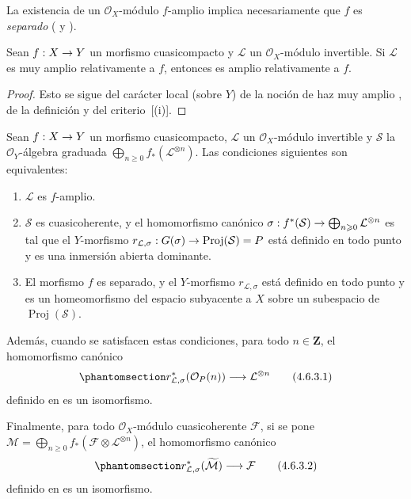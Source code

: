 \documentclass[oneside,10pt]{amsart}
\makeatletter
\renewcommand{\geq}{\geqslant}
\newcommand{\ega@arrow}[2]{\mathchoice{#1}{#2}{#2}{#2}}
\renewcommand{\to}{\ega@arrow{\longrightarrow}{\rightarrow}}
\let\EGAOriginalLabel\label
\renewcommand{\label}[1]{\phantomsection\EGAOriginalLabel{#1}}
\makeatother
\begin{document}
La existencia de un $\mathcal{O}_X$-módulo $f$-amplio implica necesariamente que $f$ es \emph{separado} ( y ).

\begin{proposition}[4.6.2]
\label{II.4.6.2-fr}
Sean $f:X\to Y$ un morfismo cuasicompacto y $\mathcal{L}$ un $\mathcal{O}_X$-módulo invertible.
Si $\mathcal{L}$ es muy amplio relativamente a $f$, entonces es amplio relativamente a $f$.
\end{proposition}

\begin{proof}
Esto se sigue del carácter local (sobre $Y$) de la noción de haz muy amplio , de la definición  y del criterio~[(i)].
\end{proof}

\begin{proposition}[4.6.3]
\label{II.4.6.3-fr}
Sean $f:X\to Y$ un morfismo cuasicompacto, $\mathcal{L}$ un $\mathcal{O}_X$-módulo invertible y $\mathcal{S}$ la $\mathcal{O}_Y$-álgebra graduada $\bigoplus_{n\geq0}f_*(\mathcal{L}^{\otimes n})$.
Las condiciones siguientes son equivalentes:
\begin{enumerate}
  \item[\rm{(a)}] $\mathcal{L}$ es $f$-amplio.
  \item[\rm{(b)}] $\mathcal{S}$ es cuasicoherente, y el homomorfismo canónico $\sigma:f^*(\mathcal{S})\to
  \bigoplus_{n\geq0}\mathcal{L}^{\otimes n}$  es tal que el $Y$-morfismo $r_{\mathcal{L},\sigma}:G(\sigma)\to\operatorname{Proj}(\mathcal{S})=P$ está definido en todo punto y es una inmersión abierta dominante.
  \item[\rm{(b')}] El morfismo $f$ es separado, y el $Y$-morfismo $r_{\mathcal{L},\sigma}$ está definido en todo punto y es un homeomorfismo del espacio subyacente a $X$ sobre un subespacio de $\operatorname{Proj}(\mathcal{S})$.
\end{enumerate}

Además, cuando se satisfacen estas condiciones, para todo $n\in\mathbf{Z}$, el homomorfismo canónico
\begin{equation}
\label{II.4.6.3.1-fr}
  r_{\mathcal{L},\sigma}^*(\mathcal{O}_P(n))
  \longrightarrow\mathcal{L}^{\otimes n}
\tag{4.6.3.1}
\end{equation}
definido en  es un isomorfismo.

Finalmente, para todo $\mathcal{O}_X$-módulo cuasicoherente $\mathcal{F}$, si se pone $\mathcal{M}=\bigoplus_{n\geq0}f_*(\mathcal{F}\otimes
\mathcal{L}^{\otimes n})$, el homomorfismo canónico
\begin{equation}
\label{II.4.6.3.2-fr}
  r_{\mathcal{L},\sigma}^*(\widetilde{\mathcal{M}})
  \longrightarrow\mathcal{F}
\tag{4.6.3.2}
\end{equation}
definido en  es un isomorfismo.
\end{proposition}
\end{document}
